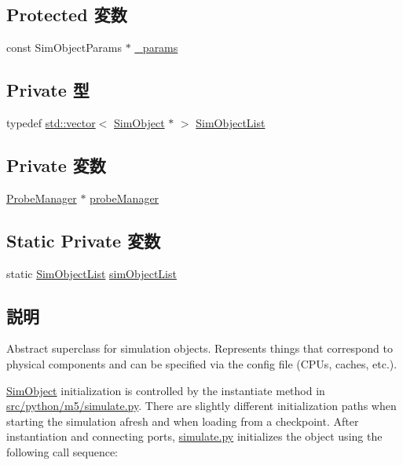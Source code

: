 \subsection*{Protected 変数}
\begin{DoxyCompactItemize}
\item 
const SimObjectParams $\ast$ \hyperlink{classSimObject_acaf6024ae9dda44bfb1c67e05ad70aef}{\_\-params}
\end{DoxyCompactItemize}
\subsection*{Private 型}
\begin{DoxyCompactItemize}
\item 
typedef \hyperlink{classstd_1_1vector}{std::vector}$<$ \hyperlink{classSimObject}{SimObject} $\ast$ $>$ \hyperlink{classSimObject_a60754b5e4ad2675dfa2974fe82692295}{SimObjectList}
\end{DoxyCompactItemize}
\subsection*{Private 変数}
\begin{DoxyCompactItemize}
\item 
\hyperlink{classProbeManager}{ProbeManager} $\ast$ \hyperlink{classSimObject_a91f0eaabebee1e88aa1c502f3e44c9d1}{probeManager}
\end{DoxyCompactItemize}
\subsection*{Static Private 変数}
\begin{DoxyCompactItemize}
\item 
static \hyperlink{classstd_1_1vector}{SimObjectList} \hyperlink{classSimObject_a7ff88c7f8734c4fdbb417055e69001c0}{simObjectList}
\end{DoxyCompactItemize}


\subsection{説明}
Abstract superclass for simulation objects. Represents things that correspond to physical components and can be specified via the config file (CPUs, caches, etc.).

\hyperlink{classSimObject}{SimObject} initialization is controlled by the instantiate method in \hyperlink{simulate_8py}{src/python/m5/simulate.py}. There are slightly different initialization paths when starting the simulation afresh and when loading from a checkpoint. After instantiation and connecting ports, \hyperlink{simulate_8py}{simulate.py} initializes the object using the following call sequence:


